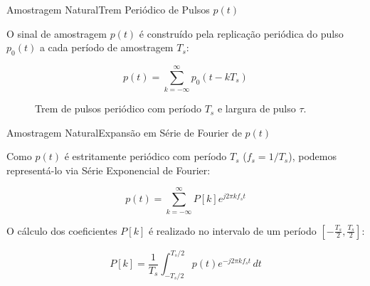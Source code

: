 \begin{frame}{Amostragem Natural}{Trem Periódico de Pulsos $p(t)$}
	
	O sinal de amostragem $p(t)$ é construído pela replicação periódica do pulso $p_0(t)$ a cada período de amostragem $T_s$:
	
	\begin{equation}
		p(t) = \sum_{k=-\infty}^{\infty} p_0(t - k T_s)
		\label{eq: definicao_trem_de_pulsos_unitario_natural}
	\end{equation}
	
	\begin{figure}
		\vfill
		\centering
		\vspace{-2em}
		\caption{Trem de pulsos periódico com período $T_s$ e largura de pulso $\tau$.}
		\label{fig: trem_de_pulsos_unitario_natural}
	\end{figure}
\end{frame}



\begin{frame}{Amostragem Natural}{Expansão em Série de Fourier de $p(t)$}
	
	Como $p(t)$ é estritamente periódico com período $T_s$ ($f_s = 1/T_s$), podemos representá-lo via Série Exponencial de Fourier:
	
	\begin{equation}
		p(t) = \sum_{k=-\infty}^{\infty} P[k] e^{j 2\pi k f_s t}
		\label{eq: representacao_serie_fourier}
	\end{equation}
	
	O cálculo dos coeficientes $P[k]$ é realizado no intervalo de um período $[-\frac{T_s}{2}, \frac{T_s}{2}]$:
	
	\begin{equation}
		P[k] = \frac{1}{T_s} \int_{-T_s/2}^{T_s/2} p(t) e^{-j 2\pi k f_s t} \, dt
		\label{eq: representacao_coeficiente_fourier_natural} 
	\end{equation}
	
\end{frame}
	
